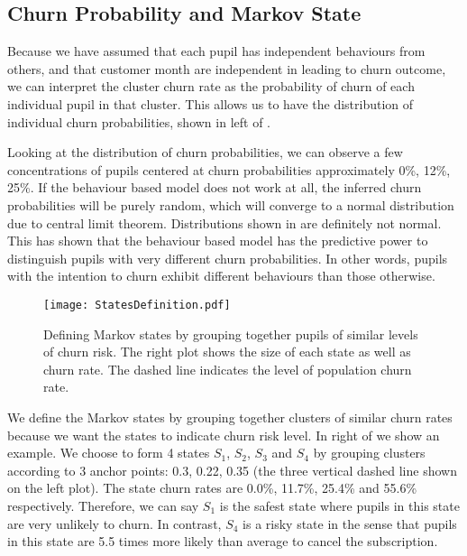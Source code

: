 \documentclass[english,a4,oneside,9pt]{extarticle}
\begin{document}
\subsection*{Churn Probability and Markov State}


Because we have assumed that each pupil has independent behaviours from others, and that customer month are independent in leading to churn outcome, we can interpret the cluster churn rate as the probability of churn of each individual pupil in that cluster. This allows us to have the distribution of individual churn probabilities, shown in left of .

Looking at the distribution of churn probabilities, we can observe a few concentrations of pupils centered at churn probabilities approximately 0\%, 12\%, 25\%. If the behaviour based model does not work at all, the inferred churn probabilities will be purely random, which will converge to a normal distribution due to central limit theorem. Distributions shown in  are definitely not normal. This has shown that the behaviour based model has the predictive power to distinguish pupils with very different churn probabilities. In other words, pupils with the intention to churn exhibit different behaviours than those otherwise.

\begin{figure}[htb]
\vspace*{-3mm}
\centering
\texttt{[image: StatesDefinition.pdf]}
\caption{Defining Markov states by grouping together pupils of similar levels of churn risk. The right plot shows the size of each state as well as churn rate. The dashed line indicates the level of population churn rate.}
\vspace*{-2mm}
\label{fig:state}
\end{figure}

We define the Markov states by grouping together clusters of similar churn rates because we want the states to indicate churn risk level. In right of  we show an example. We choose to form 4 states $S_1$, $S_2$, $S_3$ and $S_4$ by grouping clusters according to 3 anchor points: 0.3, 0.22, 0.35 (the three vertical dashed line shown on the left plot). The state churn rates are 0.0\%, 11.7\%, 25.4\% and 55.6\% respectively. Therefore, we can say $S_1$ is the safest state where pupils in this state are very unlikely to churn. In contrast, $S_4$ is a risky state in the sense that pupils in this state are 5.5 times more likely than average to cancel the subscription.
\end{document}

